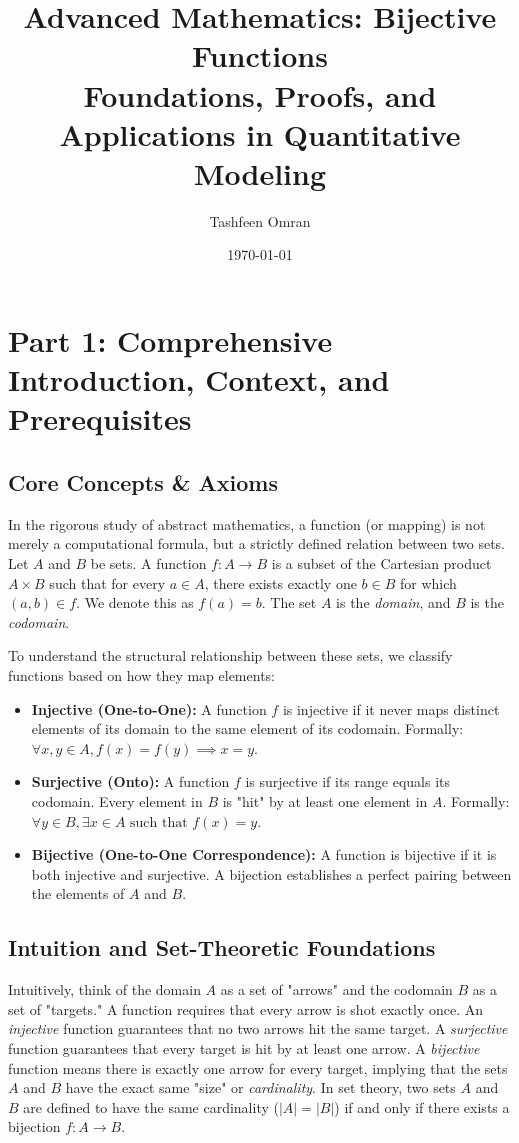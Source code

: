 \documentclass[11pt, a4paper]{article}
\title{\textbf{Advanced Mathematics: Bijective Functions \\ \Large Foundations, Proofs, and Applications in Quantitative Modeling}}
\author{Tashfeen Omran}
\date{\today}
\theoremstyle{definition}
\theoremstyle{remark}
\begin{document}
\maketitle
\tableofcontents
\newpage

\section{Part 1: Comprehensive Introduction, Context, and Prerequisites}

\subsection{Core Concepts \& Axioms}
In the rigorous study of abstract mathematics, a function (or mapping) is not merely a computational formula, but a strictly defined relation between two sets. Let $A$ and $B$ be sets. A function $f: A \to B$ is a subset of the Cartesian product $A \times B$ such that for every $a \in A$, there exists exactly one $b \in B$ for which $(a, b) \in f$. We denote this as $f(a) = b$. The set $A$ is the \textit{domain}, and $B$ is the \textit{codomain}.

To understand the structural relationship between these sets, we classify functions based on how they map elements:
\begin{itemize}
    \item \textbf{Injective (One-to-One):} A function $f$ is injective if it never maps distinct elements of its domain to the same element of its codomain. Formally: $\forall x, y \in A, f(x) = f(y) \implies x = y$.
    \item \textbf{Surjective (Onto):} A function $f$ is surjective if its range equals its codomain. Every element in $B$ is "hit" by at least one element in $A$. Formally: $\forall y \in B, \exists x \in A \text{ such that } f(x) = y$.
    \item \textbf{Bijective (One-to-One Correspondence):} A function is bijective if it is both injective and surjective. A bijection establishes a perfect pairing between the elements of $A$ and $B$.
\end{itemize}

\subsection{Intuition and Set-Theoretic Foundations}
Intuitively, think of the domain $A$ as a set of "arrows" and the codomain $B$ as a set of "targets." 
A function requires that every arrow is shot exactly once. 
An \textit{injective} function guarantees that no two arrows hit the same target. 
A \textit{surjective} function guarantees that every target is hit by at least one arrow. 
A \textit{bijective} function means there is exactly one arrow for every target, implying that the sets $A$ and $B$ have the exact same "size" or \textit{cardinality}. In set theory, two sets $A$ and $B$ are defined to have the same cardinality ($|A| = |B|$) if and only if there exists a bijection $f: A \to B$.
\end{document}

